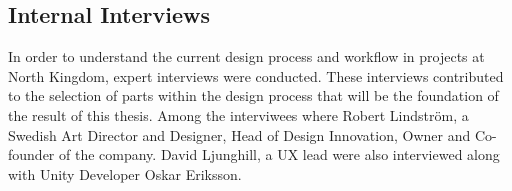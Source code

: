 \subsection{Internal Interviews}
In order to understand the current design process and workflow in projects at North Kingdom, expert interviews were conducted. These interviews contributed to the selection of parts within the design process that will be the foundation of the result of this thesis. Among the interviwees where Robert Lindstr\"om, a Swedish Art Director and Designer, Head of Design Innovation, Owner and Co-founder of the company. David Ljunghill, a UX lead were also interviewed along with Unity Developer Oskar Eriksson.
